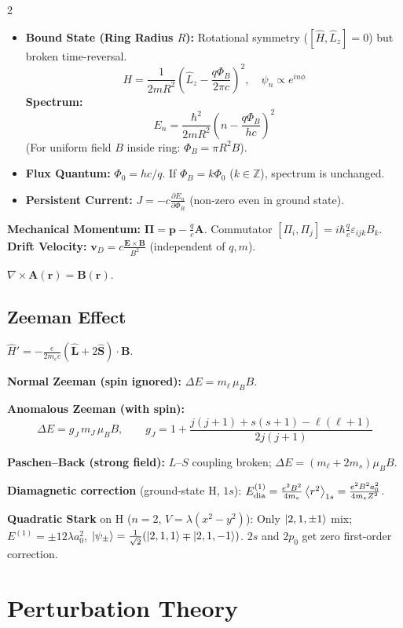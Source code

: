 \documentclass[9pt,a4paper]{article} %
\newcommand{\bs}[1]{\symbf{#1}}\usepackage{empheq}   %
\newcommand{\Hhat}{\hat{H}}
\newcommand{\Lop}{\hat{\mathbf{L}}}
\newcommand{\Sop}{\hat{\mathbf{S}}}
\begin{document}
\begin{multicols}{2}
\begin{itemize}
    \item \textbf{Bound State (Ring Radius $R$):} Rotational symmetry ($[\hat{H}, \hat{L}_z]=0$) but broken time-reversal.
    \[
    H = \frac{1}{2mR^2}\left(\hat{L}_z - \frac{q\Phi_B}{2\pi c}\right)^2, \quad \psi_n \propto e^{in\phi}
    \]
    \textbf{Spectrum:}
    \[
    E_n = \frac{\hbar^2}{2mR^2}\left(n - \frac{q \Phi_B}{h c}\right)^2
    \]
    (For uniform field $B$ inside ring: $\Phi_B = \pi R^2 B$).

    \item \textbf{Flux Quantum:} $\Phi_0 = hc/q$. If $\Phi_B = k\Phi_0$ ($k\in\mathbb{Z}$), spectrum is unchanged.
    \item \textbf{Persistent Current:} $J = -c \frac{\partial E_n}{\partial \Phi_B}$ (non-zero even in ground state).
\end{itemize}

{\footnotesize
\textbf{Mechanical Momentum:} $\bs{\Pi}=\mathbf{p}-\frac{q}{c}\mathbf{A}$. Commutator $[\Pi_i,\Pi_j]=i\hbar \frac{q}{c} \varepsilon_{ijk}B_k$.
\\
\textbf{Drift Velocity:} $\mathbf{v}_D = c \frac{\mathbf{E} \times \mathbf{B}}{B^2}$ (independent of $q, m$).

$\nabla \times \mathbf{A}(\mathbf{r}) = \mathbf{B}(\mathbf{r})$.
}
\subsection{Zeeman Effect}
$\Hhat'=-\frac{e}{2m_e c}(\Lop+2\Sop)\cdot\mathbf{B}$.

\textbf{Normal Zeeman (spin ignored):} $\Delta E=m_\ell\,\mu_B B$.

\textbf{Anomalous Zeeman (with spin):}
\[
\Delta E=g_J\,m_J\,\mu_B B,\qquad g_J=1+\frac{j(j+1)+s(s+1)-\ell(\ell+1)}{2j(j+1)}
\]

\textbf{Paschen--Back (strong field):} $L$--$S$ coupling broken; $\Delta E=(m_\ell+2m_s)\mu_B B$.

{\footnotesize
\textbf{Diamagnetic correction} (ground-state H, $1s$):
$E^{(1)}_{\rm dia}=\frac{e^2 B^2}{4m_e}\ev{r^2}_{1s}=\frac{e^2B^2 a_0^2}{4m_e Z^2}$.

\textbf{Quadratic Stark} on H ($n=2$, $V=\lambda(x^2-y^2)$):
Only $\ket{2,1,\pm 1}$ mix; $E^{(1)}=\pm 12\lambda a_0^2$,\;
$\ket{\psi_\pm}=\frac{1}{\sqrt{2}}(\ket{2,1,1}\mp\ket{2,1,-1})$.\;
$2s$ and $2p_0$ get zero first-order correction.
}


\section{Perturbation Theory}


\end{multicols}
\end{document}
